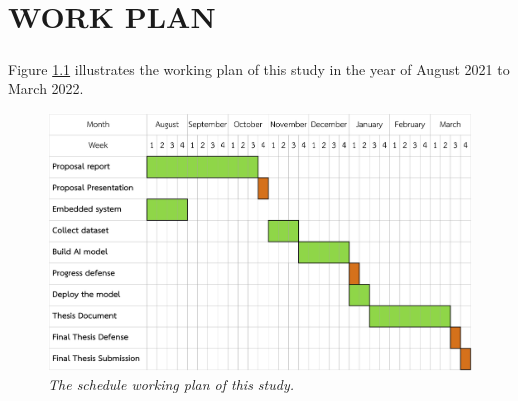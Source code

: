 \setlength{\parindent}{0in} 
\setlength{\parskip}{1em}
\setlength{\baselineskip}{1.6em}

\chapter{WORK PLAN}
\label{ch:conclusion}
\paragraph{}
Figure \ref{fig:timetable} illustrates the working plan of this study in the year of August 2021 to March 2022.

\begin{figure}[H]
  \centering
  \caption[The schedule working plan of this study.]{\emph{The schedule working plan of this study.}}\label{fig:timetable}
  \includegraphics[scale = 0.11]{figures/timetable.jpg}
  \end{figure}

\FloatBarrier

